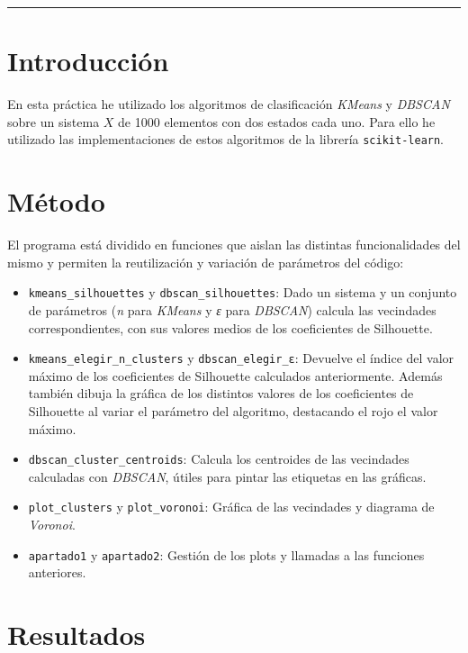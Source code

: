 \documentclass[10pt, spanish]{article}
\theoremstyle{definition}
\theoremstyle{break}
\begin{document}
 \noindent\rule{17cm}{1pt}

\section{Introducción}

En esta práctica he utilizado los algoritmos de clasificación \textit{KMeans} y
\textit{DBSCAN} sobre un sistema $X$ de 1000 elementos con dos estados cada uno.
Para ello he utilizado las implementaciones de estos algoritmos de la librería
\texttt{scikit-learn}.

\section{Método}

El programa está dividido en funciones que aislan las distintas funcionalidades
del mismo y permiten la reutilización y variación de parámetros del código:
\begin{itemize}
\setlength\itemsep{0em}
    \item \texttt{kmeans\_silhouettes} y \texttt{dbscan\_silhouettes}: Dado un
        sistema y un conjunto de parámetros (\textit{n} para \textit{KMeans} y
        \textit{ε} para \textit{DBSCAN}) calcula las vecindades
        correspondientes, con sus valores medios de los coeficientes de
        Silhouette.
    \item \texttt{kmeans\_elegir\_n\_clusters} y \texttt{dbscan\_elegir\_ε}:
        Devuelve el índice del valor máximo de los coeficientes de Silhouette
        calculados anteriormente. Además también dibuja la gráfica de los
        distintos valores de los coeficientes de Silhouette al variar el
        parámetro del algoritmo, destacando el rojo el valor máximo.
    \item \texttt{dbscan\_cluster\_centroids}:
        Calcula los centroides de las vecindades calculadas con \textit{DBSCAN},
        útiles para pintar las etiquetas en las gráficas.
    \item \texttt{plot\_clusters} y \texttt{plot\_voronoi}:
        Gráfica de las vecindades y diagrama de \textit{Voronoi}.
    \item \texttt{apartado1} y \texttt{apartado2}:
        Gestión de los plots y llamadas a las funciones anteriores.
\end{itemize}

\section{Resultados}
\end{document}
